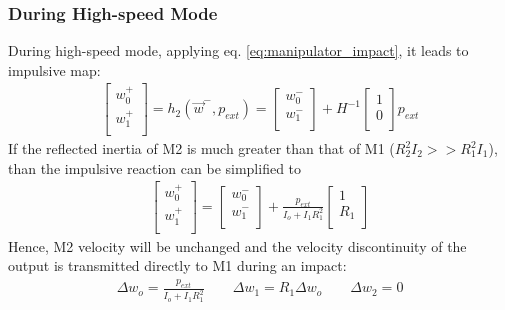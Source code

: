 \subsubsection{During High-speed Mode}

During high-speed mode, applying eq. \eqref{eq:manipulator_impact}, it leads to impulsive map:
%
\begin{align}
\left[
\begin{array}{c}
w_0^+ \\
w_1^+ \\
\end{array}
\right] = h_2( \vec{w}^- , p_{ext} ) = 
\left[
\begin{array}{c}
w_0^- \\
w_1^- \\
\end{array}
\right] +
H^{-1} \left[
\begin{array}{c}
1 \\
0 \\
\end{array}
\right] p_{ext}
\label{eq:h2}
\end{align}
%
If the reflected inertia of M2 is much greater than that of M1 ($R_2^2 I_2 >> R_1^2 I_1 $), than the impulsive reaction can be simplified to 
%
\begin{align}
\left[
\begin{array}{c}
w_0^+ \\
w_1^+ \\
\end{array}
\right] = 
\left[
\begin{array}{c}
w_0^- \\
w_1^- \\
\end{array}
\right] +
\frac{ p_{ext} }{ I_o + I_1 R_1^2} 
\left[
\begin{array}{c}
1 \\
R_1 \\
\end{array}
\right] 
\end{align}
%
Hence, M2 velocity will be unchanged and the velocity discontinuity of the output is transmitted directly to M1 during an impact:
%
\begin{align}
\Delta w_o  = \frac{ p_{ext} }{ I_o + I_1 R_1^2}  \quad\quad  %
\Delta w_1  =  R_1 \Delta w_o \quad\quad                      %
\Delta w_2  =  0                                         %
\label{eq:dsdm_impact_gen_delta_w1}
\end{align}


